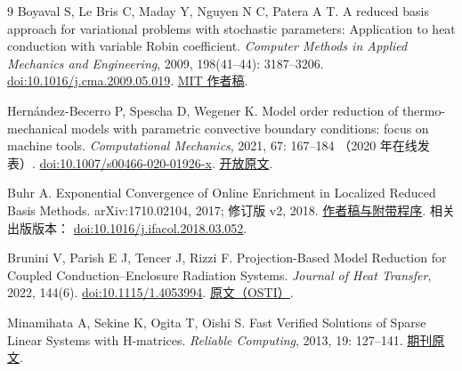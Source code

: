 \begin{thebibliography}{9}
\small
{}
Boyaval S, Le Bris C, Maday Y, Nguyen N C, Patera A T.
A reduced basis approach for variational problems with stochastic parameters:
Application to heat conduction with variable Robin coefficient.
\emph{Computer Methods in Applied Mechanics and Engineering},
2009, 198(41--44): 3187--3206.
\href{https://doi.org/10.1016/j.cma.2009.05.019}{doi:10.1016/j.cma.2009.05.019}.
\href{https://dspace.mit.edu/entities/publication/34dac50d-3f22-4e19-9447-7812843f2994}{MIT 作者稿}.

Hernández-Becerro P, Spescha D, Wegener K.
Model order reduction of thermo-mechanical models with parametric convective
boundary conditions: focus on machine tools.
\emph{Computational Mechanics}, 2021, 67: 167--184
（2020 年在线发表）.
\href{https://doi.org/10.1007/s00466-020-01926-x}{doi:10.1007/s00466-020-01926-x}.
\href{https://pmc.ncbi.nlm.nih.gov/articles/PMC7847468/}{开放原文}.

Buhr A.
Exponential Convergence of Online Enrichment in Localized Reduced Basis Methods.
arXiv:1710.02104, 2017; 修订版 v2, 2018.
\href{https://arxiv.org/abs/1710.02104}{作者稿与附带程序}.
相关出版版本：
\href{https://doi.org/10.1016/j.ifacol.2018.03.052}{doi:10.1016/j.ifacol.2018.03.052}.

Brunini V, Parish E J, Tencer J, Rizzi F.
Projection-Based Model Reduction for Coupled Conduction--Enclosure Radiation Systems.
\emph{Journal of Heat Transfer}, 2022, 144(6).
\href{https://doi.org/10.1115/1.4053994}{doi:10.1115/1.4053994}.
\href{https://www.osti.gov/servlets/purl/1894610}{原文（OSTI）}.

Minamihata A, Sekine K, Ogita T, Oishi S.
Fast Verified Solutions of Sparse Linear Systems with H-matrices.
\emph{Reliable Computing}, 2013, 19: 127--141.
\href{https://interval.louisiana.edu/reliable-computing-journal/volume-19/reliable-computing-19-pp-127-141.pdf}{期刊原文}.

\end{thebibliography}
